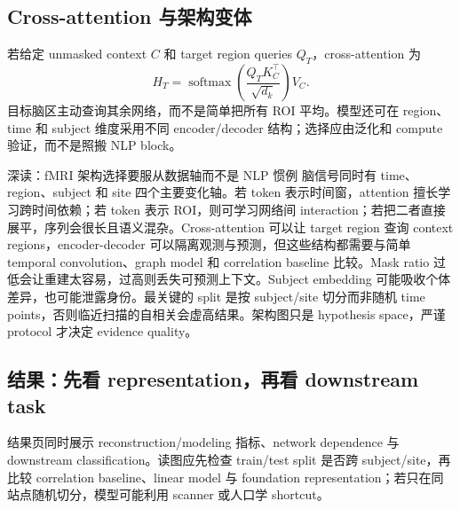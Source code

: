 

\subsection{Cross-attention 与架构变体}

若给定 unmasked context $C$ 和 target region queries $Q_T$，cross-attention 为
\[
H_T=\operatorname{softmax}\!\left(\frac{Q_TK_C^{\top}}{\sqrt{d_k}}\right)V_C.
\]
目标脑区主动查询其余网络，而不是简单把所有 ROI 平均。模型还可在 region、time 和 subject 维度采用不同 encoder/decoder 结构；选择应由泛化和 compute 验证，而不是照搬 NLP block。





\begin{knowledgebox}{深读：fMRI 架构选择要服从数据轴而不是 NLP 惯例}
脑信号同时有 time、region、subject 和 site 四个主要变化轴。若 token 表示时间窗，attention 擅长学习跨时间依赖；若 token 表示 ROI，则可学习网络间 interaction；若把二者直接展平，序列会很长且语义混杂。Cross-attention 可以让 target region 查询 context regions，encoder-decoder 可以隔离观测与预测，但这些结构都需要与简单 temporal convolution、graph model 和 correlation baseline 比较。Mask ratio 过低会让重建太容易，过高则丢失可预测上下文。Subject embedding 可能吸收个体差异，也可能泄露身份。最关键的 split 是按 subject/site 切分而非随机 time points，否则临近扫描的自相关会虚高结果。架构图只是 hypothesis space，严谨 protocol 才决定 evidence quality。
\end{knowledgebox}

\subsection{结果：先看 representation，再看 downstream task}

结果页同时展示 reconstruction/modeling 指标、network dependence 与 downstream classification。读图应先检查 train/test split 是否跨 subject/site，再比较 correlation baseline、linear model 与 foundation representation；若只在同站点随机切分，模型可能利用 scanner 或人口学 shortcut。



